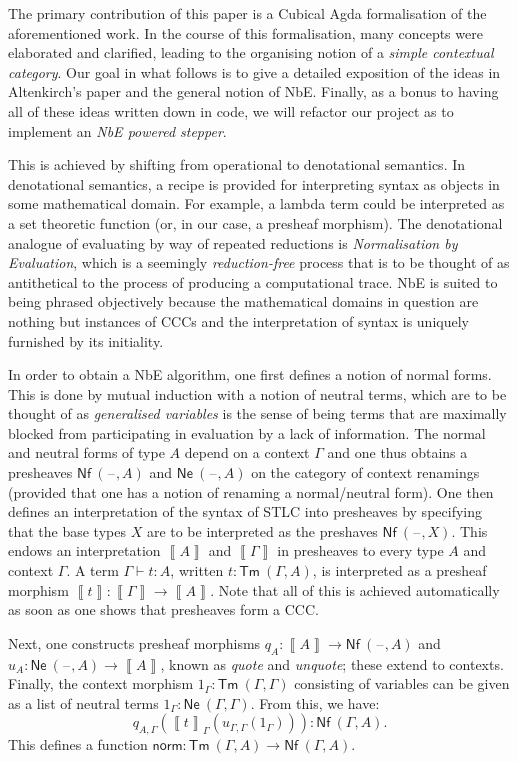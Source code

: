 \documentclass{article}[9pt]
\newcommand{\blank}{\mathord{\hspace{1pt}\text{--}\hspace{1pt}}}
\newcommand{\bkt}[1]{\left(#1\right)}
\newcommand{\lbkt}[1]{\left\llbracket#1\right\rrbracket}
\begin{document}
The primary contribution of this paper is a Cubical Agda formalisation of the
aforementioned work. In the course of this formalisation, many concepts were
elaborated and clarified, leading to the organising notion of a \emph{simple
contextual category}. Our goal in what follows is to give a detailed exposition
of the ideas in Altenkirch's paper and the general notion of NbE. Finally, as
a bonus to having all of these ideas written down in code, we will refactor
our project as to implement an \emph{NbE powered stepper}.

\iffalse
This is achieved by shifting from operational to denotational semantics. In
denotational semantics, a recipe is provided for interpreting syntax as objects
in some mathematical domain. For example, a lambda term could be interpreted as
a set theoretic function (or, in our case, a presheaf morphism). The
denotational analogue of evaluating by way of repeated reductions is
\emph{Normalisation by Evaluation}, which is a seemingly \emph{reduction-free}
process that is to be thought of as antithetical to the process of producing a
computational trace. NbE is suited to being phrased objectively because the
mathematical domains in question are nothing but instances of CCCs and the
interpretation of syntax is uniquely furnished by its initiality.

In order to obtain a NbE algorithm, one first defines a notion of normal forms.
This is done by mutual induction with a notion of neutral terms, which are to be
thought of as \emph{generalised variables} is the sense of being terms that are
maximally blocked from participating in evaluation by a lack of information. The
normal and neutral forms of type $A$ depend on a context $\Gamma$ and one thus
obtains a presheaves $\mathsf{Nf}~(\blank,A)$ and $\mathsf{Ne}~(\blank,A)$ on the
category of context renamings (provided that one has a notion of renaming a
normal/neutral form). One then defines an interpretation of the syntax of STLC
into presheaves by specifying that the base types $X$ are to be interpreted as
the preshaves $\mathsf{Nf}~(\blank,X)$. This endows an interpretation $\lbkt{A}$
and $\lbkt{\Gamma}$ in presheaves to every type $A$ and context $\Gamma$. A term
$\Gamma \vdash t : A$, written $t : \textsf{Tm}~(\Gamma, A)$, is interpreted as a
presheaf morphism $\lbkt{t} : \lbkt{\Gamma} \to \lbkt{A}$. Note that all of this
is achieved automatically as soon as one shows that presheaves form a CCC.

Next, one constructs presheaf morphisms $q_A : \lbkt{A} \to \mathsf{Nf}~(\blank,
A)$ and $u_A : \mathsf{Ne}~(\blank, A) \to \lbkt{A}$, known as \emph{quote} and
\emph{unquote}; these extend to contexts. Finally, the context morphism
$1_\Gamma : \mathsf{Tm}~(\Gamma, \Gamma)$ consisting of variables can be given as a
list of neutral terms $1_\Gamma : \mathsf{Ne}~(\Gamma,\Gamma)$. From this, we
have: \[q_{A,\Gamma} \bkt{\lbkt{t}_\Gamma \bkt{u_{\Gamma,\Gamma}
\bkt{1_\Gamma}}} : \mathsf{Nf}~(\Gamma, A).\] This defines a function
$\mathsf{norm} : \mathsf{Tm}~(\Gamma, A) \to \mathsf{Nf}~(\Gamma, A)$.
\end{document}
